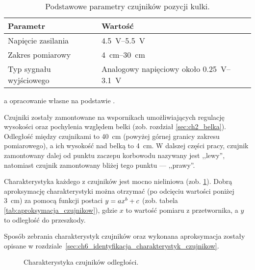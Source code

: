 \begin{table}[h]
    \centering
    \begin{threeparttable}
        \caption{Podstawowe parametry czujników pozycji kulki.}
        \label{tab:parametry_czujnikow_Sharp}
        
        \begin{tabularx}{0.75\textwidth}{l | l}
            \toprule
            Parametr & Wartość \\
            \midrule
            Napięcie zasilania & \SIrange{4,5}{5,5}{\volt} \\
            Zakres pomiarowy & \SIrange{4}{30}{\centi\meter} \\
            Typ sygnału wyjściowego & Analogowy napięciowy około \SIrange{0,25}{3,1}{\volt} \\
            \bottomrule
        \end{tabularx}
        
        \begin{tablenotes}
            \footnotesize
            \item[a] opracowanie własne na podstawie \cite{SHARP_MANUAL}.
        \end{tablenotes}
    \end{threeparttable}
\end{table}

Czujniki zostały zamontowane na wspornikach umożliwiających regulację wysokości oraz pochylenia względem belki (zob. rozdział \ref{sec:ch2_belka}). Odległość między czujnikami to \SI{40}{\centi\meter} (powyżej górnej granicy zakresu pomiarowego), a ich wysokość nad belką to \SI{4}{\centi\meter}. W dalszej części pracy, czujnik zamontowany dalej od punktu zaczepu korbowodu nazywany jest ,,lewy'', natomiast czujnik zamontowany bliżej tego punktu --- ,,prawy''.

Charakterystyka każdego z czujników jest mocno nieliniowa (zob. \cref{fig:charakterystyka_czujnikow}). Dobrą aproksymację charakterystyki można otrzymać (po odcięciu wartości poniżej \SI{3}{\centi\meter}) za pomocą funkcji postaci $y =\nobreak a x ^ b + c$ (zob. tabela \ref{tab:aproksymacja_czujnikow}), gdzie $x$ to wartość pomiaru z przetwornika, a $y$ to odległość do przeszkody.

Sposób zebrania charakterystyk czujników oraz wykonana aproksymacja zostały opisane w rozdziale~\ref{sec:ch6_identyfikacja_charakterystyk_czujnikow}.

\begin{figure}[h]
    \centering
    
    \caption{Charakterystyka czujników odległości.}
    \label{fig:charakterystyka_czujnikow}
\end{figure}

